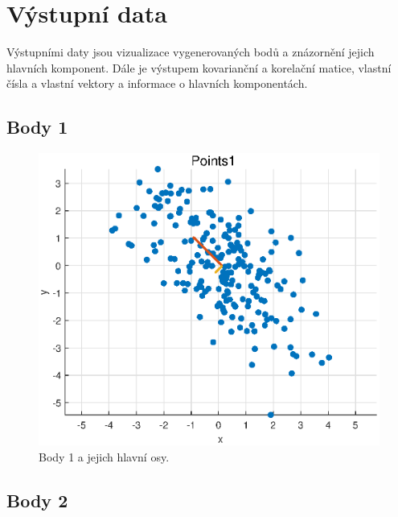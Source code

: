 \section{Výstupní data}
Výstupními daty jsou vizualizace vygenerovaných bodů a znázornění jejich hlavních komponent. Dále je výstupem kovarianční a korelační matice, vlastní čísla a vlastní vektory a informace o hlavních komponentách.

\subsection{Body 1}

\begin{figure}[H]
    \centering
    \includegraphics[width=\textwidth]{images/points1.eps}
    \caption{Body 1 a jejich hlavní osy.}
\end{figure}

\subsection{Body 2}


